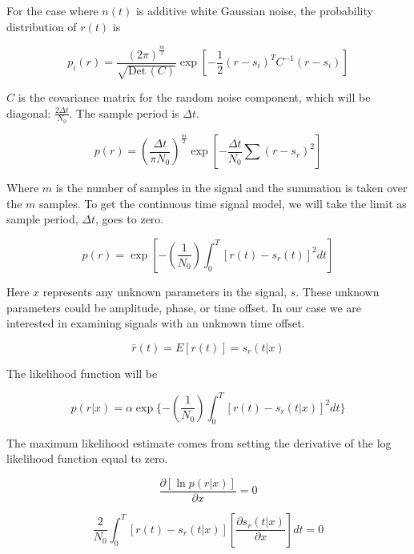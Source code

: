 \documentclass[11pt]{article}
\def\Det{{\textrm{Det}}\,}
\begin{document}
For the case where $n(t)$ is additive white Gaussian noise, the probability distribution of $r(t)$ is

\begin{equation}
p_i(r)
=
\frac{(2\pi)^\frac{m}{2}}{\sqrt{\Det(C)}}
\exp \left[ -\frac{1}{2} (r-s_i)^T C^{-1} (r-s_i) \right]
\end{equation}

$C$ is the covariance matrix for the random noise component, which will be diagonal: $\frac{2\Delta t}{N_0}$.  The sample period is $\Delta t$.

\begin{equation}
p(r)
=
\left( \frac{\Delta t}{\pi N_0} \right)^\frac{m}{2}
\exp \left[ -\frac{\Delta t}{N_0} \sum (r - s_r)^2 \right]
\end{equation}

Where $m$ is the number of samples in the signal and the summation is taken over the $m$ samples. 
To get the continuous time signal model, we will take the limit as sample period, $\Delta t$, goes to zero.

\begin{equation}
p(r) = \exp \left[ -\left(\frac{1}{N_0}\right) \int^T_0 \left[ r(t) - s_r(t) \right]^2 dt \right]
\end{equation}

Here $x$ represents any unknown parameters in the signal, $s$. These unknown parameters could be amplitude, phase, or time offset. In our case we are interested in examining signals with an unknown time offset.

\begin{equation}
\bar{r}(t) = E[r(t)] = s_r(t|x)
\end{equation}

The likelihood function will be

\begin{equation}
p(r|x) 
=
\alpha \exp \{ - \left( \frac{1}{N_0} \right) \int^T_0 \left[ r(t) - s_r(t|x) \right]^2 dt \}
\end{equation}


The maximum likelihood estimate comes from setting the derivative of the log likelihood function equal to zero.

\begin{equation}
\frac{\partial \left[ \ln p(r|x) \right]}{\partial x}
= 0
\end{equation}

\begin{equation}
\frac{2}{N_0} \int^T_0 \left[ r(t) - s_r(t|x)\right]
\left[ \frac{\partial s_r(t|x)}{\partial x} \right] dt = 0
\end{equation}
\end{document}
